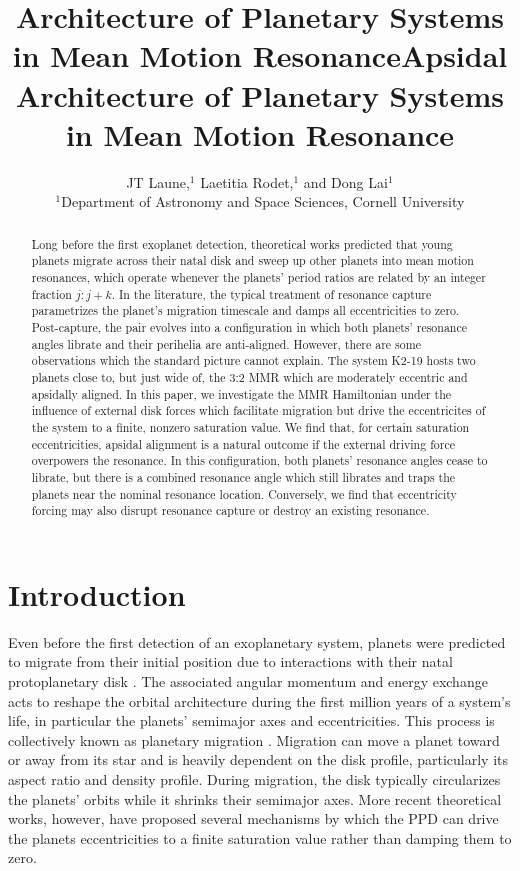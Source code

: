 \documentclass[usenatbib,twocolumn]{mnras}
\title[MMR Architecture]{Architecture of Planetary Systems in Mean Motion Resonance}
\author[Laune et al.]{
JT Laune,$^{1}$
Laetitia Rodet,$^{1}$
and Dong Lai$^{1}$
\\
$^{1}$Department of Astronomy and Space Sciences, Cornell University\\}
\date{}
\title{Apsidal Architecture of Planetary Systems in Mean Motion Resonance}
\begin{document}
\maketitle
\begin{abstract} Long before the first exoplanet detection,
theoretical works predicted that young planets migrate across their
natal disk and sweep up other planets into mean motion resonances,
which operate whenever the planets' period ratios are related by an
integer fraction $j:j+k$.  In the literature, the typical treatment of
resonance capture parametrizes the planet's migration timescale and
damps all eccentricities to zero.  Post-capture, the pair evolves into
a configuration in which both planets' resonance angles librate and
their perihelia are anti-aligned.  However, there are some
observations which the standard picture cannot explain. The system
K2-19 hosts two planets close to, but just wide of, the 3:2 MMR which
are moderately eccentric and apsidally aligned.  In this paper, we
investigate the MMR Hamiltonian under the influence of external disk
forces which facilitate migration but drive the eccentricites of the
system to a finite, nonzero saturation value.  We find that, for
certain saturation eccentricities, apsidal alignment is a natural
outcome if the external driving force overpowers the resonance.  In
this configuration, both planets' resonance angles cease to librate, but
there is a combined resonance angle which still librates and traps the
planets near the nominal resonance location.  Conversely, we find that
eccentricity forcing may also disrupt resonance capture or destroy an
existing resonance.
\end{abstract}

\section{Introduction}
\label{sec:org126fbf1}
Even before the first detection of an exoplanetary system, planets
were predicted to migrate from their initial position due to
interactions with their natal protoplanetary disk
\citep[PPD, ][]{lin79_tidal_torques_accret_discs_binar,goldreich_excitation_1979,goldreich_disk-satellite_1980-1,moutamid14_coupl_between_corot_lindb_reson}.
The associated angular momentum and energy exchange acts to reshape
the orbital architecture during the first million years of a system's
life, in particular the planets' semimajor axes and eccentricities.
This process is collectively known as planetary migration
\citep{nelson_planetary_2018}.  Migration can move a planet toward or
away from its star and is heavily dependent on the disk profile,
particularly its aspect ratio and density profile.  During migration,
the disk typically circularizes the planets' orbits while it shrinks
their semimajor axes.  More recent theoretical works, however, have
proposed several mechanisms by which the PPD can drive the planets
eccentricities to a finite saturation value rather than damping them
to zero.
\end{document}
